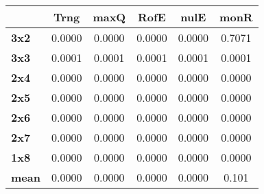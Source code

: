 \begin{tabular}{|l|c|c|c|c|c|}
\hline
&\textbf{Trng}&\textbf{maxQ}&\textbf{RofE}&\textbf{nulE}&\textbf{monR}\\\hline
\textbf{3x2}&0.0000&0.0000&0.0000&0.0000&0.7071\\\hline
\textbf{3x3}&0.0001&0.0001&0.0001&0.0001&0.0001\\\hline
\textbf{2x4}&0.0000&0.0000&0.0000&0.0000&0.0000\\\hline
\textbf{2x5}&0.0000&0.0000&0.0000&0.0000&0.0000\\\hline
\textbf{2x6}&0.0000&0.0000&0.0000&0.0000&0.0000\\\hline
\textbf{2x7}&0.0000&0.0000&0.0000&0.0000&0.0000\\\hline
\textbf{1x8}&0.0000&0.0000&0.0000&0.0000&0.0000\\\hline
\textbf{mean}&0.0000&0.0000&0.0000&0.0000&0.101\\\hline
\end{tabular}
